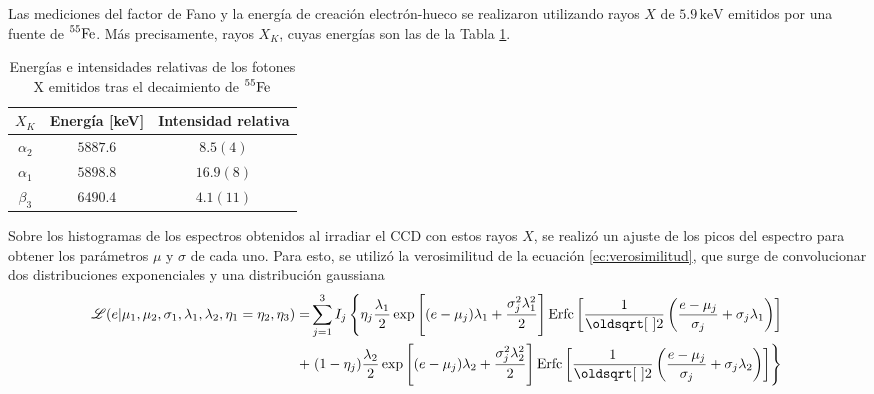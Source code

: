 Las mediciones del factor de Fano y la energía de creación electrón-hueco se realizaron utilizando rayos $X$ de $5.9\,\si{\mbox{keV}}$ emitidos por una fuente de $\prescript{55}{}{\mbox{Fe}}$. Más precisamente, rayos $X_{K}$, cuyas energías son las de la Tabla \ref{tab:EnergiasXk}.
\begin{table}[h]
\centering
\begin{tabular}{@{}ccc@{}}
\toprule
$X_{K}$         &   Energía [keV]   &   Intensidad relativa \\ \hline \hline
$\alpha_{2}$    &   $5887.6$        &   $8.5 (4)$           \\
$\alpha_{1}$    &   $5898.8$        &   $16.9 (8)$          \\
$\beta_{3}$     &   $6490.4$        &   $4.1 (11)$          \\ \bottomrule
\end{tabular}
\caption{Energías e intensidades relativas de los fotones X emitidos tras el decaimiento de $\prescript{55}{}{\mbox{Fe}}$}
\label{tab:EnergiasXk}
\end{table}
Sobre los histogramas de los espectros obtenidos al irradiar el CCD con estos rayos $X$, se realizó un ajuste de los picos del espectro para obtener los parámetros $\mu$ y $\sigma$ de cada uno. 
Para esto, se utilizó la verosimilitud de la ecuación \eqref{ec:verosimilitud}, que surge de convolucionar dos distribuciones exponenciales y una distribución gaussiana
{\small
\begin{align}
    \Lagr(e|\mu_{1},
            \mu_{2},
            \sigma_{1},
            \lambda_{1},
            \lambda_{2},
            \eta_{1} = \eta_{2},
            \eta_{3})
    = &
    \sum\limits_{j=1}^{3} I_{j}
    \left\{
        \eta_{j}\frac{\lambda_{1}}{2}
        \exp
            \left[
                (e-\mu_{j})\lambda_{1} + \frac{\sigma_{j}^{2}\lambda_{1}^{2}}{2}
            \right]
        \mbox{Erfc}
        \left[
            \frac{1}{\sqrt{2}}
            \left(
                \frac{e - \mu_{j}}{\sigma_{j}}
                +\sigma_{j}\lambda_{1}
            \right)
        \right] \right. \nonumber
        \\
        + &
        \left.
        (1-\eta_{j})\frac{\lambda_{2}}{2}
        \exp
            \left[
                 (e - \mu_{j})\lambda_{2}
                 + \frac{\sigma_{j}^{2}\lambda_{2}^{2}}{2}
            \right]
        \mbox{Erfc}
        \left[
            \frac{1}{\sqrt{2}}
            \left(
                \frac{e - \mu_{j}}{\sigma_{j}}
                +\sigma_{j}\lambda_{2}
            \right)
        \right]
    \right\}
        \label{ec:verosimilitud}
\end{align}
}%
